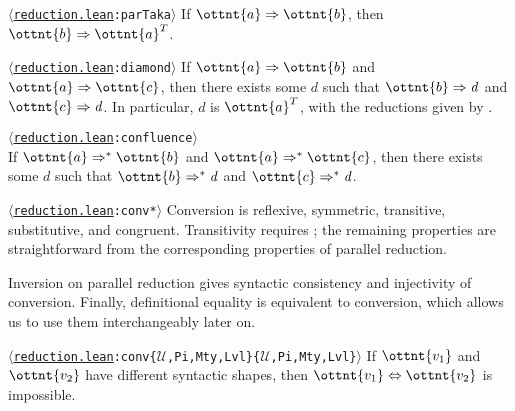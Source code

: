 \documentclass[a4paper,UKenglish,cleveref,autoref,thm-restate]{lipics-v2021}
\newcommand{\repo}{https://github.com/ionathanch/TTBFL}
\newcommand{\thmref}[2]{%
  $\langle$\href{\repo/tree/main/src/#1}{\texttt{#1}}\texttt{:#2}$\rangle$%
}
\begin{document}
\begin{lemma}[Completion (p.r.)] \thmref{reduction.lean}{parTaka} \label{lem:par:compl}
  If $ \ottnt{a}  \Rightarrow  \ottnt{b} $, then $ \ottnt{b}  \Rightarrow   \ottnt{a} ^{ \mathsf{T} }  $.
\end{lemma}

\begin{corollary}[Diamond (p.r.)] \thmref{reduction.lean}{diamond} \label{lem:par:diamond}
  If $ \ottnt{a}  \Rightarrow  \ottnt{b} $ and $ \ottnt{a}  \Rightarrow  \ottnt{c} $,
  then there exists some $d$ such that $ \ottnt{b}  \Rightarrow   \mathit{ d }  $ and $ \ottnt{c}  \Rightarrow   \mathit{ d }  $.
  In particular, $d$ is $ \ottnt{a} ^{ \mathsf{T} } $,
  with the reductions given by .
\end{corollary}

\begin{theorem}[Confluence (p.r.)] \thmref{reduction.lean}{confluence} \label{lem:par:confl} \\
  If $ \ottnt{a}  \Rightarrow^\ast  \ottnt{b} $ and $ \ottnt{a}  \Rightarrow^\ast  \ottnt{c} $,
  then there exists some $d$ such that $ \ottnt{b}  \Rightarrow^\ast   \mathit{ d }  $ and $ \ottnt{c}  \Rightarrow^\ast   \mathit{ d }  $.
\end{theorem}

\begin{corollary} \thmref{reduction.lean}{conv*} \label{lem:conv}
  Conversion is reflexive, symmetric, transitive, substitutive, and congruent.
  Transitivity requires ;
  the remaining properties are straightforward
  from the corresponding properties of parallel reduction.
\end{corollary}

Inversion on parallel reduction gives syntactic consistency and injectivity of conversion.
Finally, definitional equality is equivalent to conversion,
which allows us to use them interchangeably later on.

\begin{lemma} \thmref{reduction.lean}{conv\{$\mathcal{U}$,Pi,Mty,Lvl\}\{$\mathcal{U}$,Pi,Mty,Lvl\}} \label{lem:par:consistency}
  If $\ottnt{v_{{\mathrm{1}}}}$ and $\ottnt{v_{{\mathrm{2}}}}$ have different syntactic shapes,
  then $ \ottnt{v_{{\mathrm{1}}}}  \Leftrightarrow  \ottnt{v_{{\mathrm{2}}}} $ is impossible.
\end{lemma}
\end{document}
